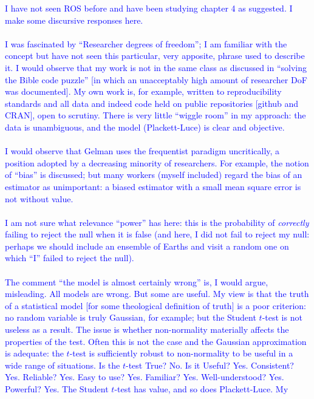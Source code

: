 \documentclass[12pt]{article}
\begin{document}
\textcolor{blue}{I have not seen ROS before and have been studying
  chapter 4 as suggested.  I make some discursive responses
  here.\\ \\ I was fascinated by ``Researcher degrees of freedom''; I
  am familiar with the concept but have not seen this particular, very
  apposite, phrase used to describe it.  I would observe that my work
  is not in the same class as discussed in ``solving the Bible code
  puzzle'' [in which an unacceptably high amount of researcher DoF was
    documented].  My own work is, for example, written to
  reproducibility standards and all data and indeed code held on
  public repositories [github and CRAN], open to scrutiny.  There is
  very little ``wiggle room'' in my approach: the data is unambiguous,
  and the model (Plackett-Luce) is clear and objective.\\ \\ I would
  observe that Gelman uses the frequentist paradigm uncritically, a
  position adopted by a decreasing minority of researchers.  For
  example, the notion of ``bias'' is discussed; but many workers
  (myself included) regard the bias of an estimator as unimportant: a
  biased estimator with a small mean square error is not without
  value.\\ \\I am not sure what relevance ``power'' has here: this is
  the probability of {\em correctly} failing to reject the null when
  it is false (and here, I did not fail to reject my null: perhaps we
  should include an ensemble of Earths and visit a random one on which
  ``I'' failed to reject the null).\\ \\ The comment ``the model is
  almost certainly wrong'' is, I would argue, misleading.  All models
  are wrong.  But some are useful.  My view is that the truth of a
  statistical model [for some theological definition of truth] is a
  poor criterion: no random variable is truly Gaussian, for example;
  but the Student $t$-test is not useless as a result.  The issue is
  whether non-normality materially affects the properties of the test.
  Often this is not the case and the Gaussian approximation is
  adequate: the $t$-test is sufficiently robust to non-normality to be
  useful in a wide range of situations.  Is the $t$-test True?  No.
  Is it Useful?  Yes.  Consistent?  Yes.  Reliable?  Yes.  Easy to
  use?  Yes.  Familiar?  Yes.  Well-understood?  Yes.  Powerful?  Yes.
  The Student $t$-test has value, and so does Plackett-Luce.  My
}
\end{document}
